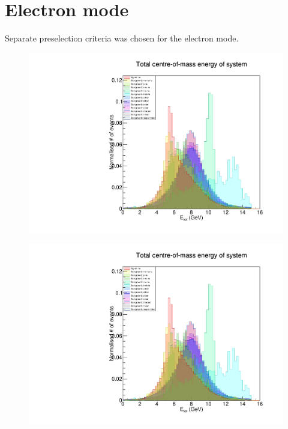 \documentclass[12pt]{thesis}  %
\begin{document}
\section{Electron mode}

Separate preselection criteria was chosen for the electron mode. 


\begin{figure}[h]
\centering
\begin{minipage}{.5\textwidth}
  \centering
  \includegraphics[width=\linewidth]{images/stack/stack_cut6_totalCM_E.pdf}
  \label{fig:test1}
\end{minipage}%
\begin{minipage}{.5\textwidth}
  \centering
  \includegraphics[width=\linewidth]{images/stack/stack_cut6_totalCM_E.pdf}
  \label{fig:test2}
\end{minipage}
\end{figure}
\end{document}
